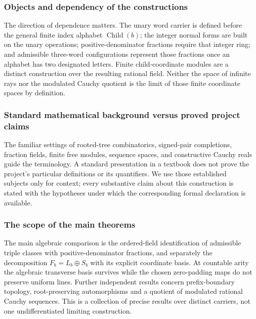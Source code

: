 \documentclass[11pt,reqno]{amsart}
\theoremstyle{definition}\newtheorem{definition}[theorem]{Definition}
\theoremstyle{remark}\newtheorem{remark}[theorem]{Remark}
\newcommand{\Fin}{\operatorname{Child}}
\begin{document}
\medskip
\subsubsection*{Objects and dependency of the constructions}\label{supp:1-1}
The direction of dependence matters. The unary word carrier is defined before the general finite index alphabet $\Fin(b)$; the integer normal forms are built on the unary operations; positive-denominator fractions require that integer ring; and admissible three-word configurations represent those fractions once an alphabet has two designated letters. Finite child-coordinate modules are a distinct construction over the resulting rational field. Neither the space of infinite rays nor the modulated Cauchy quotient is the limit of those finite coordinate spaces by definition.
\medskip
\medskip
\subsubsection*{Standard mathematical background versus proved project claims}\label{supp:1-2}
The familiar settings of rooted-tree combinatorics, signed-pair completions, fraction fields, finite free modules, sequence spaces, and constructive Cauchy reals guide the terminology. A standard presentation in a textbook does not prove the project's particular definitions or its quantifiers. We use those established subjects only for context; every substantive claim about this construction is stated with the hypotheses under which the corresponding formal declaration is available.
\medskip
\medskip
\subsubsection*{The scope of the main theorems}\label{supp:1-3}
The main algebraic comparison is the ordered-field identification of admissible triple classes with positive-denominator fractions, and separately the decomposition $F_b=L_b\oplus S_b$ with its explicit coordinate basis. At countable arity the algebraic transverse basis survives while the chosen zero-padding maps do not preserve uniform lines. Further independent results concern prefix-boundary topology, root-preserving automorphisms and a quotient of modulated rational Cauchy sequences. This is a collection of precise results over distinct carriers, not one undifferentiated limiting construction.
\medskip
\medskip
\end{document}

